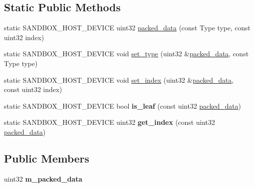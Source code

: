 \subsection*{Static Public Methods}
\begin{DoxyCompactItemize}
\item 
static S\+A\+N\+D\+B\+O\+X\+\_\+\+H\+O\+S\+T\+\_\+\+D\+E\+V\+I\+CE uint32 \hyperlink{structsandbox_1_1_bvh__node_3_01_indexed__leaf__bvh__tag_01_4_a7ad8f08b43b06f8f68fe786e22079857}{packed\+\_\+data} (const Type type, const uint32 index)
\item 
static S\+A\+N\+D\+B\+O\+X\+\_\+\+H\+O\+S\+T\+\_\+\+D\+E\+V\+I\+CE void \hyperlink{structsandbox_1_1_bvh__node_3_01_indexed__leaf__bvh__tag_01_4_aaf2ca7a89646ed6e3418ad6cffbdf28c}{set\+\_\+type} (uint32 \&\hyperlink{structsandbox_1_1_bvh__node_3_01_indexed__leaf__bvh__tag_01_4_a7ad8f08b43b06f8f68fe786e22079857}{packed\+\_\+data}, const Type type)
\item 
static S\+A\+N\+D\+B\+O\+X\+\_\+\+H\+O\+S\+T\+\_\+\+D\+E\+V\+I\+CE void \hyperlink{structsandbox_1_1_bvh__node_3_01_indexed__leaf__bvh__tag_01_4_a21ff5f7d112aebb731f30e5e44a483a2}{set\+\_\+index} (uint32 \&\hyperlink{structsandbox_1_1_bvh__node_3_01_indexed__leaf__bvh__tag_01_4_a7ad8f08b43b06f8f68fe786e22079857}{packed\+\_\+data}, const uint32 index)
\item 
\mbox{\label{structsandbox_1_1_bvh__node_3_01_indexed__leaf__bvh__tag_01_4_a12c2c2f60023978f9366830fc6c4c247}} 
static S\+A\+N\+D\+B\+O\+X\+\_\+\+H\+O\+S\+T\+\_\+\+D\+E\+V\+I\+CE bool {\bfseries is\+\_\+leaf} (const uint32 \hyperlink{structsandbox_1_1_bvh__node_3_01_indexed__leaf__bvh__tag_01_4_a7ad8f08b43b06f8f68fe786e22079857}{packed\+\_\+data})
\item 
\mbox{\label{structsandbox_1_1_bvh__node_3_01_indexed__leaf__bvh__tag_01_4_ae7a3c9968d597ff4d5ab9c834de4be2e}} 
static S\+A\+N\+D\+B\+O\+X\+\_\+\+H\+O\+S\+T\+\_\+\+D\+E\+V\+I\+CE uint32 {\bfseries get\+\_\+index} (const uint32 \hyperlink{structsandbox_1_1_bvh__node_3_01_indexed__leaf__bvh__tag_01_4_a7ad8f08b43b06f8f68fe786e22079857}{packed\+\_\+data})
\end{DoxyCompactItemize}
\subsection*{Public Members}
\begin{DoxyCompactItemize}
\item 
\mbox{\label{structsandbox_1_1_bvh__node_3_01_indexed__leaf__bvh__tag_01_4_a4b8506da03bd2c71870b79efde64ae1b}} 
uint32 {\bfseries m\+\_\+packed\+\_\+data}
\end{DoxyCompactItemize}
